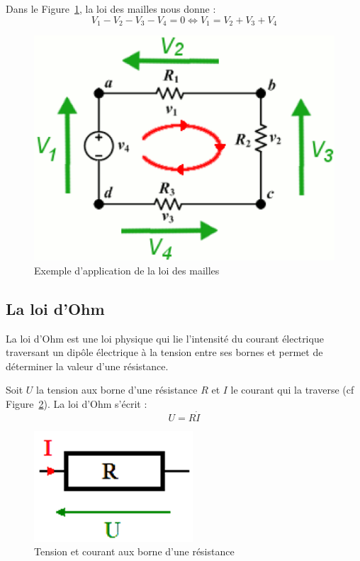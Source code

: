 \documentclass[10pt,fleqn]{article} %
\begin{document}
\begin{exemple}
  Dans le Figure~\ref{fig:maille}, la loi des mailles nous donne : $$V_1 - V_2 - V_3 - V_4 = 0 \Leftrightarrow V_1 = V_2 + V_3 + V_4$$
\end{exemple}

\begin{figure}[h]
  \centering
  \includegraphics[width=.5\textwidth]{images/loi_des_mailles}
  \caption{Exemple d'application de la loi des mailles}
  \label{fig:maille}
\end{figure}

\subsection{La loi d'Ohm}

\begin{aretenir}
  La loi d'Ohm est une loi physique qui lie l'intensité du courant électrique traversant un dipôle électrique à la tension entre ses bornes et permet de déterminer la valeur d'une résistance.

  Soit $U$ la tension aux borne d'une résistance $R$ et $I$ le courant qui la traverse (cf Figure~\ref{fig:resistance}). La loi d'Ohm s'écrit : $$U = R\dot I$$
\end{aretenir}
\begin{figure}[h]
  \centering
  \includegraphics[width=.2\textwidth]{images/resistance}
  \caption{Tension et courant aux borne d'une résistance}
  \label{fig:resistance}
\end{figure}
\end{document}
